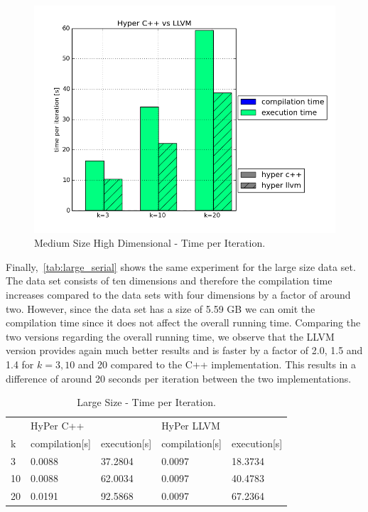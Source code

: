 \begin{figure}[htsb]
  \centering
  \includegraphics[scale=0.5, trim="0cm 1.5cm 0cm 0cm"]{figures/charts/hyper_15Mxhd}
  \caption[Medium Size High Dimensional - Time per Iteration]{Medium Size High Dimensional - Time per Iteration.}
  \label{fig:hyper_15Mxhd}
\end{figure}


Finally,~\autoref{tab:large_serial} shows the same experiment for the large size data set. The data set consists of ten dimensions and therefore the compilation time increases compared to the data sets with four dimensions by a factor of around two. However, since the data set has a size of 5.59 GB we can omit the compilation time since it does not affect the overall running time. Comparing the two versions regarding the overall running time, we observe that the LLVM version provides again much better results and is faster by a factor of 2.0, 1.5 and 1.4 for $k = 3, 10$ and 20 compared to the C++ implementation. This results in a difference of around 20 seconds per iteration between the two implementations.



\begin{table}[htsb]
  \caption[Large Size - Time per Iteration]{Large Size - Time per Iteration.}
  \label{tab:large_serial}
  \centering
  \begin{tabular}{l l l l l}
    \toprule
      & HyPer C++ & & HyPer LLVM & \\
      k & compilation[s] & execution[s] & compilation[s] & execution[s] \\
    \midrule
      3  & 0.0088 & 37.2804 & 0.0097 & 18.3734 \\
      10 & 0.0088 & 62.0034 & 0.0097 & 40.4783 \\
      20 & 0.0191 & 92.5868 & 0.0097 & 67.2364 \\
    \bottomrule
  \end{tabular}
\end{table}


